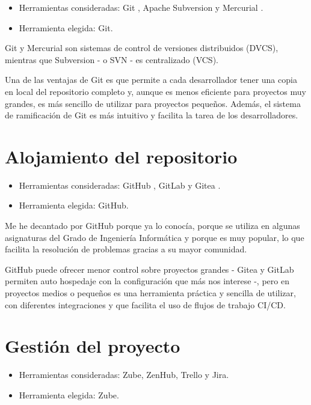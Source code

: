 \begin{itemize}
\tightlist
\item  
Herramientas consideradas: Git \citep{online:git}, Apache Subversion \citep{online:apache_subversion} 
y Mercurial \citep{online:mercurial}.
\item
  Herramienta elegida: Git.
\end{itemize}

Git y Mercurial son sistemas de control de versiones distribuidos (DVCS),
mientras que Subversion - o SVN - es centralizado (VCS). 

Una de las ventajas de Git es que permite a cada desarrollador tener una copia en local del repositorio 
completo y, aunque es menos eficiente para proyectos muy grandes, es más sencillo de utilizar para proyectos 
pequeños. Además, el sistema de ramificación de Git es más intuitivo y facilita la tarea de los desarrolladores. 

\section{Alojamiento del repositorio}\label{alojamiento_repositorio}

\begin{itemize}
\tightlist
\item
  Herramientas consideradas: GitHub \citep{online:github}, GitLab \citep{online:gitlab} y Gitea \citep{online:gitea}.
\item
  Herramienta elegida: GitHub. 
\end{itemize}

Me he decantado por GitHub porque ya lo conocía, porque se utiliza en 
algunas asignaturas del Grado de Ingeniería Informática y porque es muy 
popular, lo que facilita la resolución de problemas gracias a su mayor 
comunidad. 

GitHub puede ofrecer menor control sobre proyectos grandes - Gitea y GitLab 
permiten auto hospedaje con la configuración que más nos interese -, pero en 
proyectos medios o pequeños es una herramienta práctica y sencilla de 
utilizar, con diferentes integraciones y que facilita el uso de flujos 
de trabajo CI/CD. 

\section{Gestión del proyecto}\label{gestion-del-proyecto}

\begin{itemize}
\tightlist
\item
  Herramientas consideradas: Zube, ZenHub, Trello y Jira. 
\item
  Herramienta elegida: Zube.
\end{itemize}

